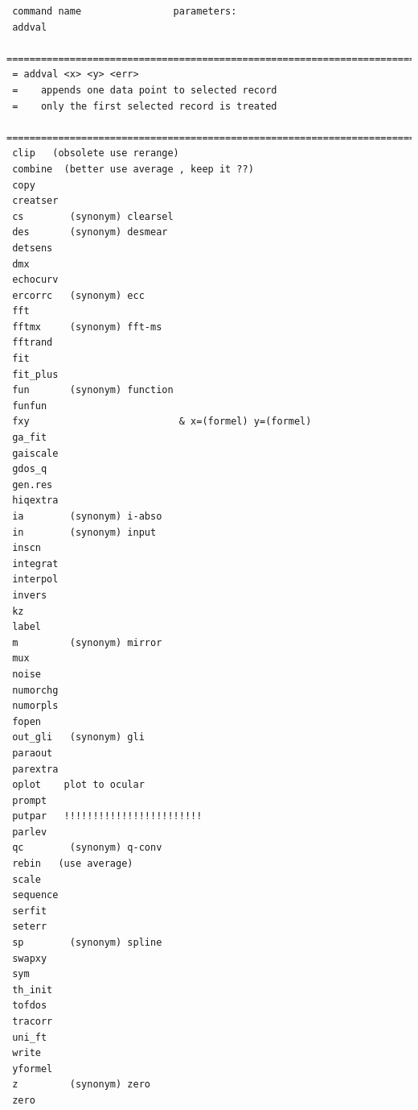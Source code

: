 \documentclass[11pt,fleqn]{book} %
\begin{document}
\begin{verbatim}
 command name                parameters: 
 addval                       
 ==============================================================================
 = addval <x> <y> <err>                                                        
 =    appends one data point to selected record                                
 =    only the first selected record is treated                                
 ==============================================================================
 clip   (obsolete use rerange)                      
 combine  (better use average , keep it ??)                    
 copy                         
 creatser                     
 cs        (synonym) clearsel 
 des       (synonym) desmear  
 detsens                      
 dmx                          
 echocurv                     
 ercorrc   (synonym) ecc      
 fft                          
 fftmx     (synonym) fft-ms   
 fftrand                      
 fit                          
 fit_plus                     
 fun       (synonym) function 
 funfun                       
 fxy                          & x=(formel) y=(formel)
 ga_fit                       
 gaiscale                     
 gdos_q                       
 gen.res                      
 hiqextra                     
 ia        (synonym) i-abso   
 in        (synonym) input    
 inscn                        
 integrat                     
 interpol                     
 invers                       
 kz                           
 label                        
 m         (synonym) mirror   
 mux                          
 noise                        
 numorchg                     
 numorpls                     
 fopen                        
 out_gli   (synonym) gli      
 paraout                      
 parextra                     
 oplot    plot to ocular      
 prompt                       
 putpar   !!!!!!!!!!!!!!!!!!!!!!!!                    
 parlev                       
 qc        (synonym) q-conv   
 rebin   (use average)                      
 scale                        
 sequence                     
 serfit                       
 seterr                       
 sp        (synonym) spline   
 swapxy                       
 sym                          
 th_init                      
 tofdos                       
 tracorr                      
 uni_ft                       
 write                        
 yformel                      
 z         (synonym) zero     
 zero                         








\end{verbatim}
\end{document}
